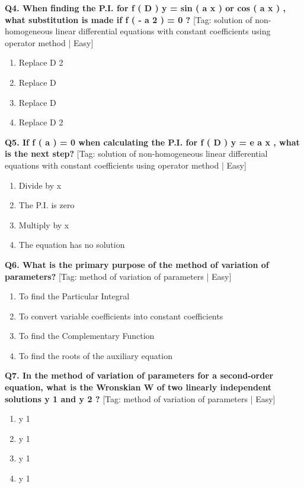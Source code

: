 \noindent\textbf{Q4. When finding the P.I. for f ( D ) y = sin ( a x ) or cos ( a x ) , what substitution is made if f ( - a 2 )  = 0 ?} \hfill [Tag: solution of non-homogeneous linear differential equations with constant coefficients using operator method | Easy]
\begin{enumerate}[label=(\alph*),topsep=2pt,itemsep=1pt,partopsep=0pt,parsep=0pt]
    \item {{Replace D 2}}
    \item {{Replace D}}
    \item {{Replace D}}
    \item {{Replace D 2}}
\end{enumerate}
\vspace{2mm}

\noindent\textbf{Q5. If f ( a ) = 0 when calculating the P.I. for f ( D ) y = e a x , what is the next step?} \hfill [Tag: solution of non-homogeneous linear differential equations with constant coefficients using operator method | Easy]
\begin{enumerate}[label=(\alph*),topsep=2pt,itemsep=1pt,partopsep=0pt,parsep=0pt]
    \item {{Divide by x}}
    \item {{The P.I. is zero}}
    \item {{Multiply by x}}
    \item {{The equation has no solution}}
\end{enumerate}
\vspace{2mm}

\noindent\textbf{Q6. What is the primary purpose of the method of variation of parameters?} \hfill [Tag: method of variation of parameters | Easy]
\begin{enumerate}[label=(\alph*),topsep=2pt,itemsep=1pt,partopsep=0pt,parsep=0pt]
    \item {{To find the Particular Integral}}
    \item {{To convert variable coefficients into constant coefficients}}
    \item {{To find the Complementary Function}}
    \item {{To find the roots of the auxiliary equation}}
\end{enumerate}
\vspace{2mm}

\noindent\textbf{Q7. In the method of variation of parameters for a second-order equation, what is the Wronskian W of two linearly independent solutions y 1 and y 2 ?} \hfill [Tag: method of variation of parameters | Easy]
\begin{enumerate}[label=(\alph*),topsep=2pt,itemsep=1pt,partopsep=0pt,parsep=0pt]
    \item {{y 1}}
    \item {{y 1}}
    \item {{y 1}}
    \item {{y 1}}
\end{enumerate}
\vspace{2mm}

